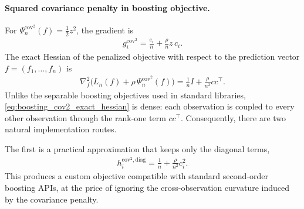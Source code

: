 \documentclass[12pt, draft]{article}
\theoremstyle{plain}
\theoremstyle{definition}
\newcommand{\1}{\mathbf{1}}
\begin{document}
{%



\paragraph{Squared covariance penalty in boosting objective.}
For \(\Psi_n^{\mathrm{cov}^2}(f)=\tfrac12 z^2\), the gradient is
\begin{align}
    \label{eq:boosting_cov2_gradient}
    g_i^{\mathrm{cov}^2}
    =
    \frac{e_i}{n}
    +
    \frac{\rho}{n}z\,c_i.
\end{align}
The exact Hessian of the penalized objective with respect to the prediction vector \(f=(f_1,\dots,f_n)\) is
\begin{align}
    \label{eq:boosting_cov2_exact_hessian}
    \nabla_f^2
    \bigl(L_n(f)+\rho\,\Psi_n^{\mathrm{cov}^2}(f)\bigr)
    =
    \frac{1}{n}I
    +
    \frac{\rho}{n^2}cc^\top.
\end{align}
Unlike the separable boosting objectives used in standard libraries, \eqref{eq:boosting_cov2_exact_hessian} is dense: each observation is coupled to every other observation through the rank-one term \(cc^\top\). Consequently, there are two natural implementation routes.

The first is a practical approximation that keeps only the diagonal terms,
\begin{align}
    \label{eq:boosting_cov2_diag_hessian}
    h_i^{\mathrm{cov}^2,\mathrm{diag}}
    =
    \frac{1}{n}
    +
    \frac{\rho}{n^2}c_i^2.
\end{align}
This produces a custom objective compatible with standard second-order boosting APIs, at the price of ignoring the cross-observation curvature induced by the covariance penalty.

}
\end{document}
